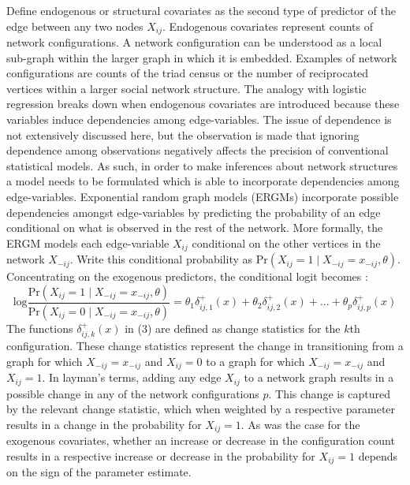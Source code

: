 \documentclass[a4paper, man]{apa6}
\begin{document}
Define endogenous or structural covariates as the second type of predictor of the edge between any two nodes $X_{ij}$. Endogenous covariates represent counts of network configurations. A network configuration can be understood as a local sub-graph within the larger graph in which it is embedded. Examples of network configurations are counts of the triad census or the number of reciprocated vertices within a larger social network structure. The analogy with logistic regression breaks down when endogenous covariates are introduced because these variables induce dependencies among edge-variables. The issue of dependence is not extensively discussed here, but the observation is made that ignoring dependence among observations negatively affects the precision of conventional statistical models. As such, in order to make inferences about network structures a model needs to be formulated which is able to incorporate dependencies among edge-variables. Exponential random graph models (ERGMs) incorporate possible dependencies amongst edge-variables by predicting the probability of an edge conditional on what is observed in the rest of the network. More formally, the ERGM models each edge-variable $X_{ij}$ conditional on the other vertices in the network $X_{-ij}$. Write this conditional probability as $\text{Pr}(X_{ij}=1 \mid X_{−ij} = x_{−ij}, θ)$. Concentrating on the exogenous predictors, the conditional logit becomes : \begin{equation} \text{log}\frac{\text{Pr}(X_{ij} = 1 \mid X_{-ij} = x_{-ij}, \theta)}{\text{Pr}(X_{ij} = 0 \mid X_{-ij} = x_{-ij}, \theta)} = \theta_{1}\delta_{ij,1}^{+}(x) + \theta_{2}\delta_{ij,2}^{+}(x) + ... + \theta_{p}\delta_{ij, p}^{+}(x) \end{equation} The functions $\delta_{ij,k}^{+}(x)$ in (3) are defined as change statistics for the $k$th configuration. These change statistics represent the change in transitioning from a graph for which $X_{−ij} = x_{−ij}$ and $X_{ij} = 0$ to a graph for which $X_{−ij} = x_{−ij}$ and $X_{ij} = 1$. In layman's terms,  adding any edge $X_{ij}$ to a network graph results in a possible change in any of the network configurations $p$. \clearpage \noindent This change is captured by the relevant change statistic, which when weighted by a respective parameter results in a change in the probability for $X_{ij} = 1$. As was the case for the exogenous covariates, whether an increase or decrease in the configuration count results in a respective increase or decrease in the probability for $X_{ij} = 1$ depends on the sign of the parameter estimate.  
\end{document}
